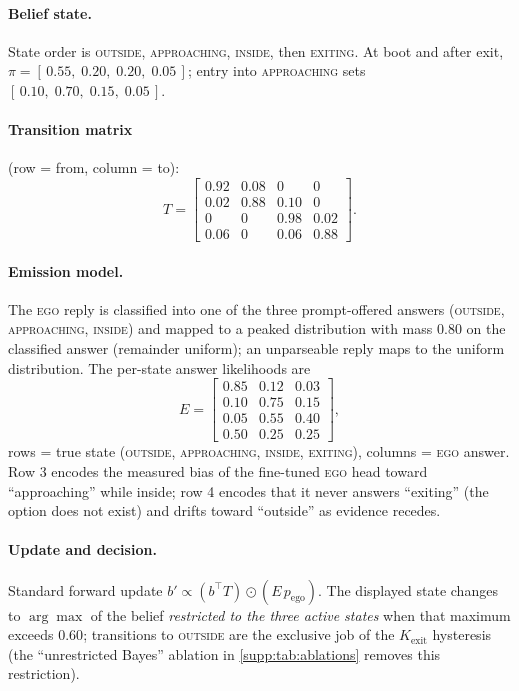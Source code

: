 \documentclass[10pt,twocolumn,letterpaper]{article}
\begin{document}
\paragraph{Belief state.}  State order is \textsc{outside}, \textsc{approaching}, \textsc{inside}, then \textsc{exiting}.  At boot and after exit, $\pi=[\,0.55,\;0.20,\;0.20,\;0.05\,]$; entry into \textsc{approaching} sets $[\,0.10,\;0.70,\;0.15,\;0.05\,]$.

\paragraph{Transition matrix} (row = from, column = to): \[
T = \begin{bmatrix}
0.92 & 0.08 & 0    & 0    \\
0.02 & 0.88 & 0.10 & 0    \\
0    & 0    & 0.98 & 0.02 \\
0.06 & 0    & 0.06 & 0.88
\end{bmatrix}.
\]

\paragraph{Emission model.}  The \textsc{ego} reply is classified into one of the three prompt-offered answers (\textsc{outside}, \textsc{approaching}, \textsc{inside}) and mapped to a peaked distribution with mass $0.80$ on the classified answer (remainder uniform); an unparseable reply maps to the uniform distribution.  The per-state answer likelihoods are \[
E = \begin{bmatrix}
0.85 & 0.12 & 0.03 \\
0.10 & 0.75 & 0.15 \\
0.05 & 0.55 & 0.40 \\
0.50 & 0.25 & 0.25
\end{bmatrix},
\] rows = true state (\textsc{outside}, \textsc{approaching}, \textsc{inside}, \textsc{exiting}), columns = \textsc{ego} answer.  Row 3 encodes the measured bias of the fine-tuned \textsc{ego} head toward ``approaching'' while inside; row 4 encodes that it never answers ``exiting'' (the option does not exist) and drifts toward ``outside'' as evidence recedes.

\paragraph{Update and decision.}  Standard forward update $b' \propto (b^\top T) \odot (E\,p_\text{ego})$.  The displayed state changes to $\arg\max$ of the belief \emph{restricted to the three active states} when that maximum exceeds $0.60$; transitions to \textsc{outside} are the exclusive job of the $K_\text{exit}$ hysteresis (the ``unrestricted Bayes'' ablation in \cref{supp:tab:ablations} removes this restriction).
\end{document}
